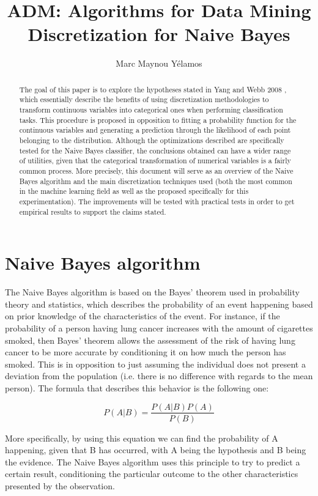 \documentclass{article}
\title{ADM: Algorithms for Data Mining \\[1ex] \large Discretization for Naive Bayes}
\author{Marc Maynou Yélamos }
\begin{document}
\maketitle

\begin{abstract}
The goal of this paper is to explore the hypotheses stated in Yang and Webb 2008 \cite{yang08}, which essentially describe the benefits of using discretization methodologies to transform continuous variables into categorical ones when performing classification tasks. This procedure is proposed in opposition to fitting a probability function for the continuous variables and generating a prediction through the likelihood of each point belonging to the distribution. Although the optimizations described are specifically tested for the Naive Bayes classifier, the conclusions obtained can have a wider range of utilities, given that the categorical transformation of numerical variables is a fairly common process. More precisely, this document will serve as an overview of the Naive Bayes algorithm and the main discretization techniques used (both the most common in the machine learning field as well as the proposed specifically for this experimentation). The improvements will be tested with practical tests in order to get empirical results to support the claims stated.

\end{abstract}

\section{Naive Bayes algorithm}

The Naive Bayes algorithm is based on the Bayes’ theorem\cite{enwiki:1077742010} used in probability theory and statistics, which describes the probability of an event happening based on prior knowledge of the characteristics of the event. For instance, if the probability of a person having lung cancer increases with the amount of cigarettes smoked, then Bayes' theorem allows the assessment of the risk of having lung cancer to be more accurate by conditioning it on how much the person has smoked. This is in opposition to just assuming the individual does not present a deviation from the population (i.e. there is no difference with regards to the mean person). The formula that describes this behavior is the following one:

\[P(A|B) = \frac{P(A|B) P(A)}{P(B)} \]

More specifically, by using this equation we can find the probability of A happening, given that B has occurred, with A being the hypothesis and B being the evidence. The Naive Bayes algorithm\cite{KDnuggetsNBC} uses this principle to try to predict a certain result, conditioning the particular outcome to the other characteristics presented by the observation. 
\end{document}
